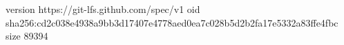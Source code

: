 version https://git-lfs.github.com/spec/v1
oid sha256:cd2c038e4938a9bb3d17407e4778aed0ea7c028b5d2b2fa17e5332a83ffe4fbc
size 89394
